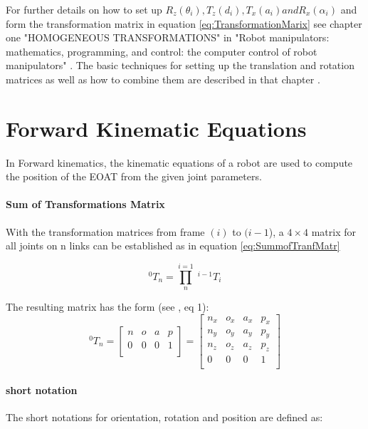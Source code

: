 For further details on how to set up $R_z(\theta_i), T_z(d_i), T_x(a_i) and R_x(\alpha_i)$ and form the transformation matrix in equation \ref{eq:TransformationMarix} see chapter one "HOMOGENEOUS TRANSFORMATIONS" in "Robot manipulators: mathematics, programming, 
and control: the computer control of robot manipulators" \cite{Paul1981RobotM}. The basic techniques for setting up the translation and rotation matrices as well as how to combine them are described in that chapter .

\section{Forward Kinematic Equations} \label{ForKinEq}
In Forward kinematics, the kinematic equations of a robot are used to compute the position of the \ac{EOAT} from the given joint parameters.

\paragraph{Sum of Transformations Matrix}
With the transformation matrices from frame $(i)$ to $(i-1$), a $4×4$ matrix for all joints on n links can be established as in equation \ref{eq:SummofTranfMatr}

\begin{equation} \label{eq:SummofTranfMatr}
	^0T_n=\prod_{n}^{i=1} \phantom{.}^{i-1}T_i
\end{equation}


The resulting matrix has the form (see \cite{invKinSolYanWu}, eq 1):
\begin{equation}\label{eq:matrixForm}
	^0T_n=
	\begin{bmatrix}
	n & o & a & p \\
	0 & 0 & 0 & 1 \\
	\end{bmatrix}
	=
	\begin{bmatrix}
	n_x & o_x & a_x & p_x \\
	n_y & o_y & a_y & p_y \\ %
	n_z & o_z & a_z & p_z \\
	0 & 0 & 0 & 1 \\
	\end{bmatrix}
\end{equation}

\paragraph{short notation}
The short notations for orientation, rotation and position are defined as:

